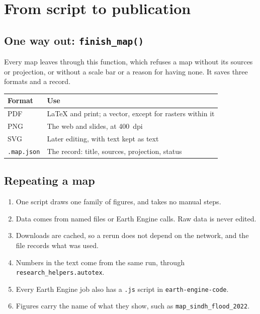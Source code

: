 \chapter{From script to publication}\label{ch:workflow}

\section{One way out: \texttt{finish\_map()}}
Every map leaves through this function, which refuses a map without its sources or projection, or without a scale bar or a reason for having none. It saves three formats and a record.



\begin{tabularx}{\linewidth}{@{}lX@{}}
\toprule
Format & Use \\
\midrule
PDF & LaTeX and print; a vector, except for rasters within it \\
PNG & The web and slides, at 400~dpi \\
SVG & Later editing, with text kept as text \\
\texttt{.map.json} & The record: title, sources, projection, status \\
\bottomrule
\end{tabularx}

\section{Repeating a map}
\begin{enumerate}
\item One script draws one family of figures, and takes no manual steps.
\item Data comes from named files or Earth Engine calls. Raw data is never edited.
\item Downloads are cached, so a rerun does not depend on the network, and the file records what was used.
\item Numbers in the text come from the same run, through \texttt{research\_helpers.autotex}.
\item Every Earth Engine job also has a \texttt{.js} script in \texttt{earth-engine-code}.
\item Figures carry the name of what they show, such as \texttt{map\_sindh\_flood\_2022}.
\end{enumerate}

